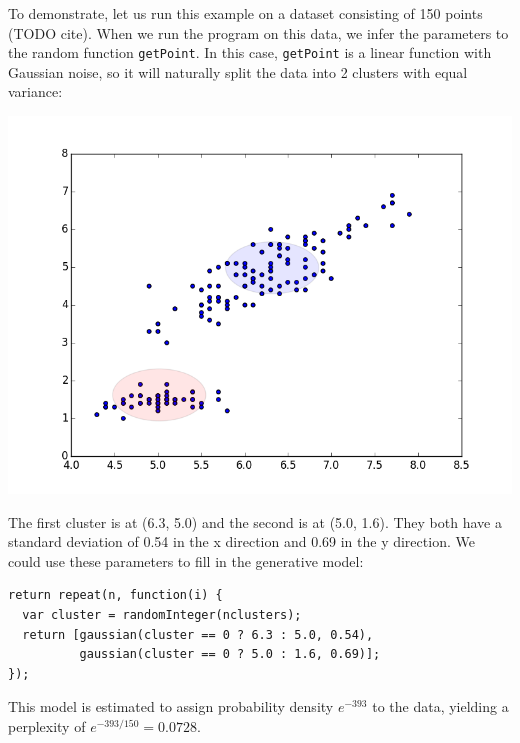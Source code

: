 \documentclass{article}
\begin{document}
  To demonstrate, let us run this example on a dataset consisting of 150 points (TODO cite).  When we run the program on this data, we infer the parameters to the random function \texttt{getPoint}.
  In this case, \texttt{getPoint} is a linear function with Gaussian noise, so it will naturally
  split the data into 2 clusters with equal variance:
  \begin{center}
    \includegraphics[scale=0.5]{../plots/irisclusters_orig.png}
  \end{center}

  The first cluster is at (6.3, 5.0) and the second is at (5.0, 1.6).  They both
  have a standard deviation of 0.54 in the x direction and 0.69 in the y direction.
  We could use these parameters to fill in the generative model:
  \begin{lstlisting}
return repeat(n, function(i) {
  var cluster = randomInteger(nclusters);
  return [gaussian(cluster == 0 ? 6.3 : 5.0, 0.54),
          gaussian(cluster == 0 ? 5.0 : 1.6, 0.69)];
});
  \end{lstlisting}
  This model is estimated to assign probability density $e^{-393}$ to the data, yielding a perplexity of $e^{-393/150} = 0.0728$.
\end{document}
